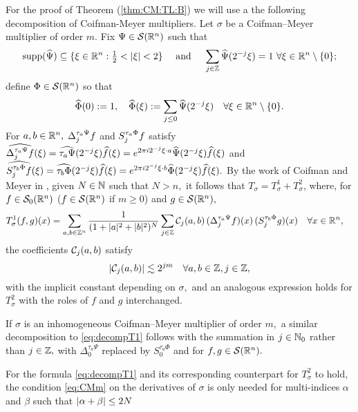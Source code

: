 For the proof of Theorem (\ref{thm:CM:TL:B}) we will use a the following decomposition of Coifman-Meyer multipliers. Let $\sigma$ be a Coifman--Meyer multiplier of order $m.$
Fix $\Psi \in {\mathcal{S}}({{\mathbb R}^n})$ such that 
$$
{\rm{supp}}(\widehat{\Psi}) \subseteq \{ \xi \in {{\mathbb R}^n} : {\textstyle \frac{1}{2}} < |\xi| < 2 \} \quad\text{ and }\quad
\sum_{j\in\mathbb{Z}} \widehat{\Psi}(2^{-j}\xi) = 1 \,\,\forall \xi \in {{\mathbb R}^n} \setminus \{ 0 \};
$$
define $\Phi \in {\mathcal{S}}({{\mathbb R}^n})$ so that
$$
\widehat{\Phi}(0) := 1,\quad \widehat{\Phi}(\xi) := \sum_{j \le 0} \widehat{\Psi}(2^{-j}\xi)\quad \forall \xi \in {{\mathbb R}^n} \setminus \{0\}.$$
For $a,b\in{{\mathbb R}^n},$ $\Delta^{\tau_a \Psi }_{j} f$ and  $S^{ \tau_a \Phi }_{j} f$ satisfy $\widehat{\Delta^{\tau_a \Psi }_{j} f}(\xi)=\widehat{\tau_a\Psi}(2^{-j}\xi)\widehat{f}(\xi)=e^{2\pi i 2^{-j}\xi\cdot a} \widehat{\Psi}(2^{-j}\xi)\widehat{f}(\xi)$ and   $\widehat{S^{\tau_b \Phi }_{j} f}(\xi)=\widehat{\tau_b\Phi}(2^{-j}\xi)\widehat{f}(\xi)=e^{2\pi i 2^{-j}\xi\cdot b} \widehat{\Phi}(2^{-j}\xi)\widehat{f}(\xi).$ 
By the work of Coifman and Meyer in \cite{MR518170},  given $N\in \mathbb{N}$ such that $N>n,$ it follows that $T_\sigma= T_\sigma^1 + T_\sigma^2$, where, for  $f\in {\mathcal{S}_0}({{\mathbb R}^n})$ ($f\in {\mathcal{S}}({{\mathbb R}^n})$ if $m\ge 0$) and $g\in{\mathcal{S}}({{\mathbb R}^n}),$
\begin{align}\label{eq:decompT1}
T_\sigma^1(f,g)(x) &= \sum_{a,b\in \mathbb{Z}^n} \frac{1}{(1+|a|^2+|b|^2)^N} \sum_{j\in\mathbb{Z}} \mathcal{C}_j(a,b) \,(\Delta^{ \tau_a \Psi }_{j} f)(x)\, (S^{ \tau_b \Phi }_{j} g )(x)\quad \forall x\in {{\mathbb R}^n},
\end{align}
 the coefficients $\mathcal{C}_j(a,b)$   satisfy
\begin{equation}\label{eq:cjbound}
\left\vert \mathcal{C}_j(a,b) \right\vert\lesssim 2^{jm}\quad \forall a,b\in\mathbb{Z}, j\in \mathbb{Z},
\end{equation}
with the implicit constant depending on $\sigma,$ and an analogous expression holds for $T_\sigma^2$ with the roles of $f$ and $g$ interchanged. 

If $\sigma$ is an inhomogeneous Coifman--Meyer multiplier of order $m,$ a similar decomposition to \eqref{eq:decompT1} follows  with the summation in $j\in\mathbb{N}_0$ rather than $j\in\mathbb{Z},$  with  $\Delta_0^{\tau_a \Psi}$ replaced by $S_0^{\tau_a\Phi}$ and for $f,g\in {\mathcal{S}}({{\mathbb R}^n}).$

\begin{remark}\label{re:numderiv1} For the formula \eqref{eq:decompT1}  and its corresponding counterpart for $T^2_\sigma$ to hold, the condition \eqref{eq:CMm} on the derivatives of $\sigma$ is only needed for multi-indices $\alpha$ and $\beta$ such that  $\left\vert \alpha+\beta \right\vert\le 2N$
\end{remark}


